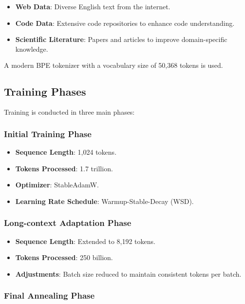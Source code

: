 \documentclass{article}
\begin{document}
\begin{itemize}  
    \item \textbf{Web Data}: Diverse English text from the internet.  
    \item \textbf{Code Data}: Extensive code repositories to enhance code understanding.  
    \item \textbf{Scientific Literature}: Papers and articles to improve domain-specific knowledge.  
\end{itemize}  
  
A modern BPE tokenizer with a vocabulary size of 50,368 tokens is used.  
  
\subsection{Training Phases}  
  
Training is conducted in three main phases:  
  
\subsubsection{Initial Training Phase}  
  
\begin{itemize}  
    \item \textbf{Sequence Length}: 1,024 tokens.  
    \item \textbf{Tokens Processed}: 1.7 trillion.  
    \item \textbf{Optimizer}: StableAdamW.  
    \item \textbf{Learning Rate Schedule}: Warmup-Stable-Decay (WSD).  
\end{itemize}  
  
\subsubsection{Long-context Adaptation Phase}  
  
\begin{itemize}  
    \item \textbf{Sequence Length}: Extended to 8,192 tokens.  
    \item \textbf{Tokens Processed}: 250 billion.  
    \item \textbf{Adjustments}: Batch size reduced to maintain consistent tokens per batch.  
\end{itemize}  
  
\subsubsection{Final Annealing Phase}  
  
\end{document}
